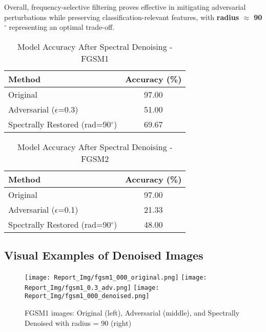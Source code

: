 \documentclass[a4paper,12pt]{report}%
\begin{document}
Overall, frequency-selective filtering proves effective in mitigating adversarial perturbations while preserving classification-relevant features, with \textbf{radius $\approx$ 90$^{\circ}$} representing an optimal trade-off.

\begin{table}[H]
\centering
\caption{Model Accuracy After Spectral Denoising - FGSM1}
\begin{tabular}{|l|c|}
\hline
Method & Accuracy (\%) \\
\hline
Original              & 97.00 \\
Adversarial ($\epsilon$=0.3)            & 51.00 \\
Spectrally Restored (rad=90$^{\circ}$)   & 69.67 \\
\hline
\end{tabular}
\end{table}

\begin{table}[H]
\centering
\caption{Model Accuracy After Spectral Denoising - FGSM2}
\begin{tabular}{|l|c|}
\hline
Method & Accuracy (\%) \\
\hline
Original              & 97.00 \\
Adversarial ($\epsilon$=0.1)           & 21.33 \\
Spectrally Restored (rad=90$^{\circ}$)   & 48.00 \\
\hline
\end{tabular}
\end{table}

\subsection{Visual Examples of Denoised Images}
\begin{figure}[!htb]
  \texttt{[image: Report\_Img/fgsm1\_000\_original.png]}
\endminipage\hfill
{}
  \texttt{[image: Report\_Img/fgsm1\_0.3\_adv.png]}
\endminipage\hfill
{}
  \texttt{[image: Report\_Img/fgsm1\_000\_denoised.png]}
\endminipage\hfill
\caption{FGSM1 images: Original (left), Adversarial (middle), and Spectrally Denoised with radius = 90 (right)}\label{fig:fgsm1_denoised}
\end{figure}
\end{document}
